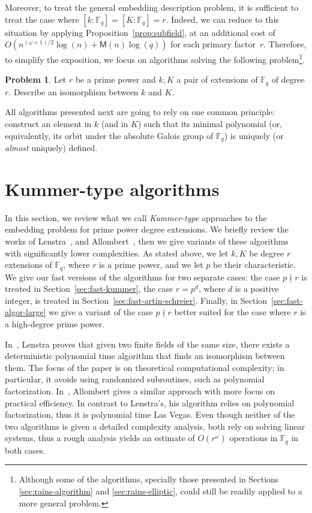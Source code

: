 \documentclass{mcom-l}
\theoremstyle{plain}
\theoremstyle{definition}
\newtheorem*{problem}{Problem}
\newcommand{\F}{\ensuremath{\mathbb{F}}}
\newcommand{\MM}{\ensuremath{\mathsf{M}}}
\newcounter{algorithm}
\begin{document}
Moreover, to treat the general embedding description problem,
it is sufficient to treat the case where $[k:\F_q]=[K:\F_q]=r$.
Indeed, we can reduce to this situation by applying
Proposition~\ref{prop:subfield}, at an additional cost of
$O(n^{(\omega+1)/2}\log(n) + \MM(n)\log(q))$ for each primary factor~$r$.
Therefore, to simplify the exposition, we focus on algorithms
solving the following problem\footnote{Although some of the algorithms, specially
those presented in Sections \ref{sec:rains-algorithm} and \ref{sec:rains-elliptic},
could still be readily applied to a more general problem.}.
\begin{problem}
\label{prob:embedding}
Let $r$ be a prime power and $k, K$ a pair of extensions of $\F_q$
of degree $r$.
Describe an isomorphism between $k$ and $K$.
\end{problem}
All algorithms presented next are going to rely on one common
principle: construct an element in $k$ (and in $K$) such that its
minimal polynomial (or, equivalently, its orbit under the absolute
Galois group of $\F_q$) is uniquely (or \emph{almost} uniquely)
defined.

\section{Kummer-type algorithms}
\label{sec:kummer}

In this section, we review what we call \emph{Kummer-type} approaches to the embedding problem for prime power degree extensions. 
We briefly review the works of Lenstra~\cite{LenstraJr91},
and Allombert~\cite{Allombert02,Allombert02-rev}, then 
we give variants of these algorithms with significantly lower complexities.
As stated above, we let $k, K$ be degree $r$ extensions of $\F_q$,
where $r$ is a prime power,
and we let $p$ be their characteristic.
We give our fast versions of the algorithms for two separate cases: the case $p \nmid r$
is treated in Section~\ref{sec:fast-kummer}, the case $r = p^d$, where $d$ 
is a positive integer, is treated in Section~\ref{sec:fast-artin-schreier}.
Finally, in Section~\ref{sec:fast-algor-large} we give a variant of the case
$p \nmid r$ better suited for the case where $r$ is a high-degree prime power.

In~\cite{LenstraJr91}, Lenstra proves that 
given two finite fields of the same size, there exists a deterministic polynomial time algorithm 
that finds an isomorphism between them.
The focus of the paper is on theoretical computational complexity;
in particular, it avoids using randomized subroutines, such as polynomial
factorization. 
In~\cite{Allombert02,Allombert02-rev}, Allombert gives a similar approach with more focus on practical efficiency.
In contrast to Lenstra's, his algorithm relies on polynomial factorization, thus it is
polynomial time Las Vegas.
Even though neither of the two algorithms is given a detailed complexity analysis, both rely
on solving linear systems, thus a rough analysis yields an estimate of $O(r^{\omega})$ operations
in $\F_q$ in both cases.
\end{document}
